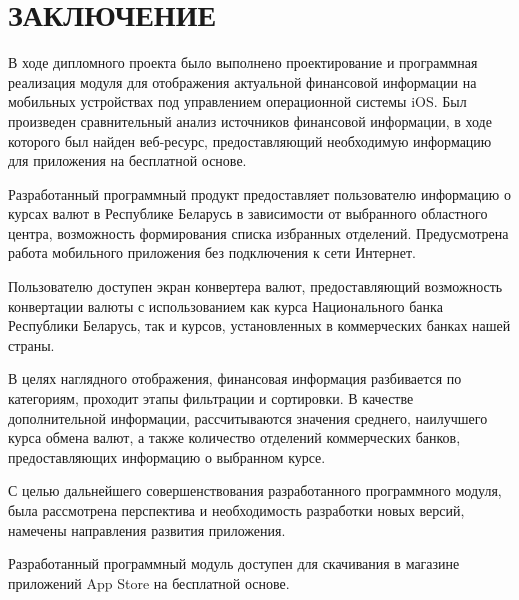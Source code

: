 \section*{ЗАКЛЮЧЕНИЕ}

В ходе дипломного проекта было выполнено проектирование и программная реализация
модуля для отображения актуальной финансовой информации на мобильных устройствах
под управлением операционной системы iOS. Был произведен сравнительный
анализ источников финансовой информации, в ходе которого был найден
веб-ресурс, предоставляющий необходимую информацию для приложения на
бесплатной основе.

Разработанный программный продукт предоставляет пользователю информацию о курсах
валют в Республике Беларусь в зависимости от выбранного областного центра,
возможность формирования списка избранных отделений.
Предусмотрена работа мобильного приложения без подключения к сети Интернет.

Пользователю доступен экран конвертера валют, предоставляющий возможность
конвертации валюты с использованием как курса Национального банка Республики
Беларусь, так и курсов, установленных в коммерческих банках нашей страны.

В целях наглядного отображения, финансовая информация разбивается
по категориям, проходит этапы фильтрации и сортировки. В качестве дополнительной
информации, рассчитываются значения среднего, наилучшего курса обмена валют,
а также количество отделений коммерческих банков, предоставляющих информацию о
выбранном курсе.

С целью дальнейшего совершенствования разработанного программного модуля,
была рассмотрена перспектива и необходимость разработки новых версий,
намечены направления развития приложения.

Разработанный программный модуль доступен для скачивания в магазине приложений
App Store на бесплатной основе.

